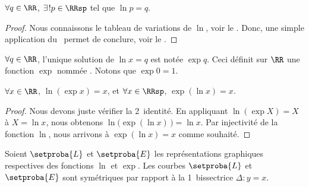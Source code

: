 \begin{fact}
	$\forall q \in \RR$,
	$\exists\kern1pt! p \in \RRsp$ tel que 
	$\ln p = q$.
\end{fact}


\begin{proof}
	Nous connaissons le tableau de variations de $\ln$, voir le .
	Donc, une simple application du \tvi\ permet de conclure, voir le .
\end{proof}




\begin{defi}
	$\forall q \in \RR$, 
	l'unique solution de $\ln x = q$ est notée $\exp q$.
	Ceci définit sur $\RR$ une fonction $\exp$ nommée .
	Notons que $\exp 0 = 1$.
\end{defi}




\begin{fact}
	$\forall x \in \RR$, $\ln ( \exp x ) = x$,
	et
	$\forall x \in \RRsp$, $\exp ( \ln x ) = x$.
\end{fact}


\begin{proof}	
	Nous devons juste vérifier la 2\ieme\ identité.
	En appliquant $\ln ( \exp X ) = X$ à $X = \ln x$,
	nous obtenons $\ln \big( \exp ( \ln x ) \,\big) = \ln x$.
	Par injectivité de la fonction $\ln$, nous arrivons à $\exp ( \ln x ) = x$ comme souhaité.
\end{proof}




\begin{fact} \label{exp-sym-ln}
	Soient $\setproba{L}$ et $\setproba{E}$ les représentations graphiques respectives des fonctions $\ln$ et $\exp$.
	Les courbes $\setproba{L}$ et $\setproba{E}$ sont symétriques par rapport à la 1\iere\ bissectrice $\Delta: y = x$.
\end{fact}


